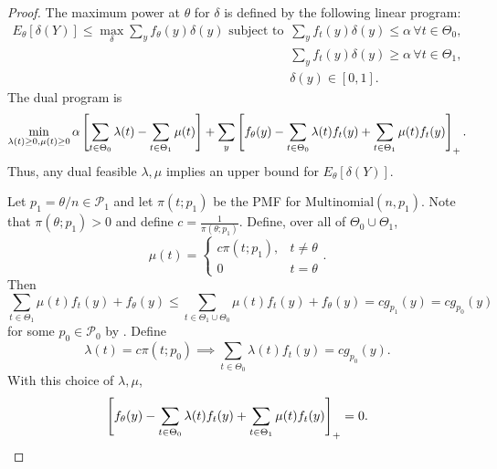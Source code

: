 \documentclass[12pt,reqno]{amsart}
\begin{document}
\propunbiased*
\begin{proof}
    The maximum power at $\theta$ for $\delta$ is defined by the following linear program:
    \begin{align*}
    E_\theta[\delta(Y)] \le \max_{\delta} \sum_{y} f_\theta(y) \delta(y) \text{ subject to } 
    &\sum_y f_t(y) \delta(y) \le \alpha \, \forall t \in \Theta_0, \\
&\sum_y f_t(y) \delta(y) \ge \alpha \, \forall t \in \Theta_1, \\
&\delta(y) \in [0,1].
    \end{align*}
    The dual program is \[
        \min_{\lambda(t)\ge 0, \mu(t)\ge 0} \alpha\left[{\sum_{t\in\Theta_0} \lambda(t) - \sum_
        {t\in\Theta_1} \mu(t)}\right] + \sum_y \left[{
            f_{\theta}(y) - \sum_{t \in \Theta_0} \lambda(t) f_t(y) + \sum_{t\in \Theta_1}
            \mu(t) f_t(y)
        }\right]_+.
    \]
    Thus, any dual feasible $\lambda, \mu$ implies an upper bound for $E_\theta[\delta(Y)].$
    
    Let $p_1 = \theta /n \in \mathcal P_1$ and let $\pi(t; p_1)$ be the PMF for $
    \mathrm{Multinomial}(n,p_1)$. Note that $\pi(\theta; p_1) > 0$ and define $c =
    \frac{1}{\pi(\theta; p_1)}$. Define, over all of $\Theta_0 \cup \Theta_1$, \[
        \mu(t) = \begin{cases}
            c \pi(t;p_1), &t \neq \theta \\
0 & t = \theta           
        \end{cases}.
    \]
    Then \[
       \sum_{t\in \Theta_1} \mu(t) f_t(y) + f_\theta(y) \le \sum_{t\in
       \Theta_1\cup\Theta_0} \mu(t) f_t(y) + f_\theta(y) = c g_{p_1}(y) = c g_
        {p_0}(y)
    \]
    for some $p_0 \in \mathcal P_0$ by . Define \[
        \lambda(t) = c\pi(t; p_0) \implies \sum_{t \in \Theta_0} \lambda(t) f_t(y) = c g_
        {p_0}(y).
    \]
    With this choice of $\lambda, \mu$, \[
        \left[{
            f_{\theta}(y) - \sum_{t \in \Theta_0} \lambda(t) f_t(y) + \sum_{t\in \Theta_1}
            \mu(t) f_t(y)
        }\right]_+ = 0.
    \]


\end{proof}
\end{document}
